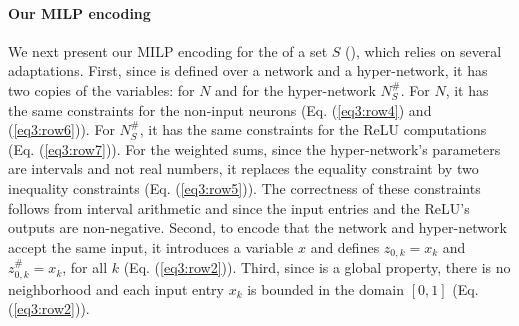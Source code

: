 \paragraph{Our MILP encoding} 
We next present our MILP encoding for 
the \propa of a set $S$ (), which relies on several adaptations. %
First, since \propa is defined over a network and a hyper-network, it has two copies of the variables: for $N$ and for the hyper-network $N^\#_S$. For $N$, it has the same constraints for the non-input neurons (Eq. (\ref{eq3:row4}) and (\ref{eq3:row6})).
For $N^\#_S$, it has the same constraints for the ReLU computations (Eq. (\ref{eq3:row7})). 
For the weighted sums, since the hyper-network's parameters are intervals and not real numbers,
it replaces the equality constraint by two inequality constraints (Eq. (\ref{eq3:row5})). The correctness of these constraints follows from interval arithmetic and since the input entries and the ReLU's outputs are non-negative.
Second, to encode that the network and hyper-network accept the same input, it introduces a variable $x$ and defines $z_{0,k}=x_k$ and 
$z_{0,k}^\#=x_k$, for all $k$ (Eq. (\ref{eq3:row2})).
Third, since \propa is a global property, there is no neighborhood and each input entry $x_k$ is bounded in the domain $[0,1]$ (Eq. (\ref{eq3:row2})). %

